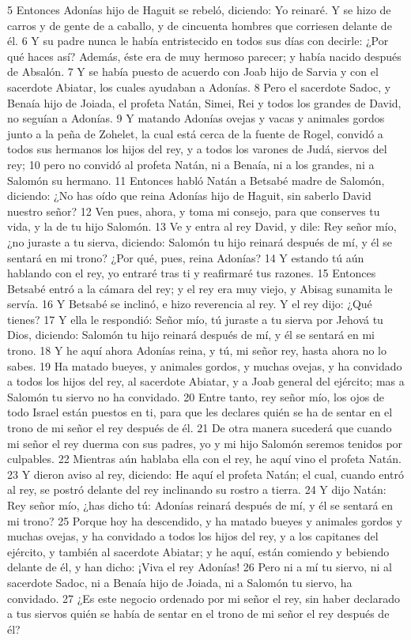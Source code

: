 5 Entonces Adonías hijo de Haguit se rebeló, diciendo: Yo reinaré. Y se hizo de carros y de gente de a caballo, y de cincuenta hombres que corriesen delante de él.
6 Y su padre nunca le había entristecido en todos sus días con decirle: ¿Por qué haces así? Además, éste era de muy hermoso parecer; y había nacido después de Absalón.
7 Y se había puesto de acuerdo con Joab hijo de Sarvia y con el sacerdote Abiatar, los cuales ayudaban a Adonías.
8 Pero el sacerdote Sadoc, y Benaía hijo de Joiada, el profeta Natán, Simei, Rei y todos los grandes de David, no seguían a Adonías.
9 Y matando Adonías ovejas y vacas y animales gordos junto a la peña de Zohelet, la cual está cerca de la fuente de Rogel, convidó a todos sus hermanos los hijos del rey, y a todos los varones de Judá, siervos del rey;
10 pero no convidó al profeta Natán, ni a Benaía, ni a los grandes, ni a Salomón su hermano.
11 Entonces habló Natán a Betsabé madre de Salomón, diciendo: ¿No has oído que reina Adonías hijo de Haguit, sin saberlo David nuestro señor?
12 Ven pues, ahora, y toma mi consejo, para que conserves tu vida, y la de tu hijo Salomón.
13 Ve y entra al rey David, y dile: Rey señor mío, ¿no juraste a tu sierva, diciendo: Salomón tu hijo reinará después de mí, y él se sentará en mi trono? ¿Por qué, pues, reina Adonías?
14 Y estando tú aún hablando con el rey, yo entraré tras ti y reafirmaré tus razones.
15 Entonces Betsabé entró a la cámara del rey; y el rey era muy viejo, y Abisag sunamita le servía.
16 Y Betsabé se inclinó, e hizo reverencia al rey. Y el rey dijo: ¿Qué tienes?
17 Y ella le respondió: Señor mío, tú juraste a tu sierva por Jehová tu Dios, diciendo: Salomón tu hijo reinará después de mí, y él se sentará en mi trono.
18 Y he aquí ahora Adonías reina, y tú, mi señor rey, hasta ahora no lo sabes.
19 Ha matado bueyes, y animales gordos, y muchas ovejas, y ha convidado a todos los hijos del rey, al sacerdote Abiatar, y a Joab general del ejército; mas a Salomón tu siervo no ha convidado.
20 Entre tanto, rey señor mío, los ojos de todo Israel están puestos en ti, para que les declares quién se ha de sentar en el trono de mi señor el rey después de él.
21 De otra manera sucederá que cuando mi señor el rey duerma con sus padres, yo y mi hijo Salomón seremos tenidos por culpables.
22 Mientras aún hablaba ella con el rey, he aquí vino el profeta Natán.
23 Y dieron aviso al rey, diciendo: He aquí el profeta Natán; el cual, cuando entró al rey, se postró delante del rey inclinando su rostro a tierra.
24 Y dijo Natán: Rey señor mío, ¿has dicho tú: Adonías reinará después de mí, y él se sentará en mi trono?
25 Porque hoy ha descendido, y ha matado bueyes y animales gordos y muchas ovejas, y ha convidado a todos los hijos del rey, y a los capitanes del ejército, y también al sacerdote Abiatar; y he aquí, están comiendo y bebiendo delante de él, y han dicho: ¡Viva el rey Adonías!
26 Pero ni a mí tu siervo, ni al sacerdote Sadoc, ni a Benaía hijo de Joiada, ni a Salomón tu siervo, ha convidado.
27 ¿Es este negocio ordenado por mi señor el rey, sin haber declarado a tus siervos quién se había de sentar en el trono de mi señor el rey después de él?

